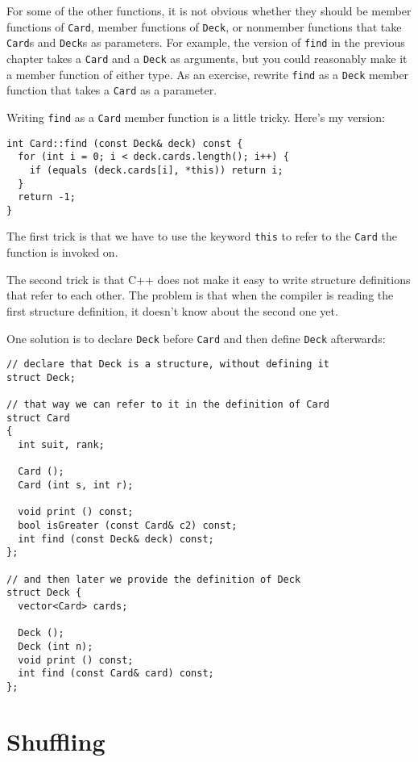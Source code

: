 For some of the other functions, it is not obvious whether they should
be member functions of {\tt Card}, member functions of {\tt Deck}, or
nonmember functions that take {\tt Card}s and {\tt Deck}s as parameters.
For example, the version of {\tt find} in the previous chapter
takes a {\tt Card} and a {\tt Deck} as arguments, but you could
reasonably make it a member function of either type.  As an exercise,
rewrite {\tt find} as a {\tt Deck} member function that takes
a {\tt Card} as a parameter.

Writing {\tt find} as a {\tt Card} member
function is a little tricky.  Here's my version:

\begin{lstlisting}
int Card::find (const Deck& deck) const {
  for (int i = 0; i < deck.cards.length(); i++) {
    if (equals (deck.cards[i], *this)) return i;
  }
  return -1;
}
\end{lstlisting}
%
The first trick is that we have to use the keyword {\tt this}
to refer to the {\tt Card} the function is invoked on.


The second trick is that C++ does not make it easy to write
structure definitions that refer to each other.  The problem
is that when the compiler is reading the first structure
definition, it doesn't know about the second one yet.

One solution is to declare {\tt Deck} before {\tt Card} and
then define {\tt Deck} afterwards:

\begin{lstlisting}
// declare that Deck is a structure, without defining it
struct Deck;

// that way we can refer to it in the definition of Card
struct Card
{
  int suit, rank;

  Card ();
  Card (int s, int r);

  void print () const;
  bool isGreater (const Card& c2) const;
  int find (const Deck& deck) const;
};

// and then later we provide the definition of Deck
struct Deck {
  vector<Card> cards;

  Deck ();
  Deck (int n);
  void print () const;
  int find (const Card& card) const;
};
\end{lstlisting}


\section{Shuffling}
\label{shuffle}

